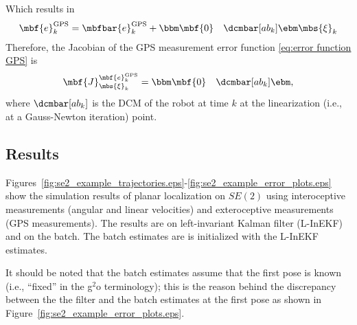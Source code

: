 \documentclass[ nobib, nofonts, notoc]{tufte-handout}
\begin{document}
    Which results in
    \begin{align}
        \mbf{e}^{\mathrm{GPS}}_{k}
        &=
        \mbfbar{e}^{\mathrm{GPS}}_{k}
        +
        \bbm
        \mbf{0} & \dcmbar[ab_{k}]
        \ebm
        \mbs{\xi}_{k}
    \end{align}
    Therefore, the Jacobian of the GPS measurement error function \eqref{eq:error function GPS} is
    \begin{align}
        \mbf{J}^{
            \mbf{e}^{\mathrm{GPS}}_{k}
        }_{\mbs{\xi}_{k}}
        &=
        \bbm
            \mbf{0} &
            \dcmbar[ab_{k}]
        \ebm,
    \end{align}
    where $\dcmbar[ab_{k}]$ is the DCM of the robot at time $k$ at the linearization (i.e., at a Gauss-Newton iteration) point.

    \clearpage
    \subsection{Results}
    Figures~\ref{fig:se2_example_trajectories.eps}-\ref{fig:se2_example_error_plots.eps} show the simulation results of planar localization on $SE(2)$ using interoceptive measurements (angular and linear velocities) and exteroceptive measurements (GPS measurements).
    The results are on left-invariant Kalman filter (L-InEKF) and on the batch.
    The batch estimates are is initialized with the L-InEKF estimates.

    It should be noted that the batch estimates assume that the first pose is known (i.e., ``fixed'' in the g$^2$o terminology); 
    this is the reason behind the discrepancy between the the filter and the batch estimates at the first pose as shown in Figure~\ref{fig:se2_example_error_plots.eps}.
\end{document}
